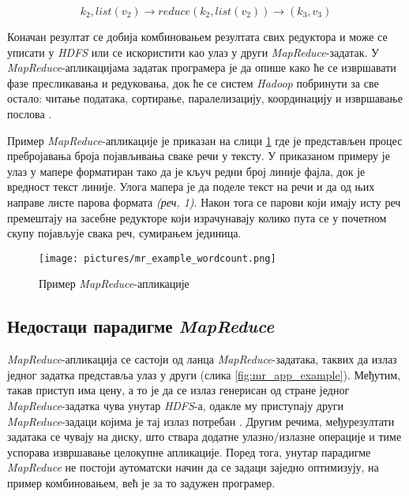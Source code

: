 \documentclass[12pt,oneside]{memoir}
\begin{document}
$$ k_2, list(v_2) \rightarrow reduce(k_2, list(v_2)) \rightarrow (k_3, v_3) $$

Коначан резултат се добија комбиновањем резултата свих редуктора и може се уписати у \textit{HDFS} или се искористити као улаз у други \textit{MapReduce}-задатак. У \textit{MapReduce}-апликацијама задатак програмера је да опише како ће се извршавати фазе пресликавања и редуковања, док ће се систем \textit{Hadoop} побринути за све остало: читање података, сортирање, паралелизацију, координацију и извршавање послова \cite{hadoop_beginner}.

Пример \textit{MapReduce}-апликације је приказан на слици \ref{fig:map_reduce} где је представљен процес пребројавања броја појављивања сваке речи у тексту. У приказаном примеру је улаз у мапере форматиран тако да је кључ редни број линије фајла, док је вредност текст линије. Улога мапера је да поделе текст на речи и да од њих направе листе парова формата \textit{(реч, 1)}. Након тога се парови који имају исту реч премештају на засебне редукторе који израчунавају колико пута се у почетном скупу појављује свака реч, сумирањем јединица.

\begin{figure}[!ht]
  \centering
  \texttt{[image: pictures/mr\_example\_wordcount.png]}
  \caption{Пример \textit{MapReduce}-апликације}
  \label{fig:map_reduce}
\end{figure}


\subsection{Недостаци парадигме \textit{MapReduce}}
\label{subsec:nedost_mr}

\textit{MapReduce}-апликација се састоји од ланца \textit{MapReduce}-задатака, таквих да излаз једног задатка представља улаз у други (слика \ref{fig:mr_app_example}). Међутим, такав приступ има цену, а то је да се излаз генерисан од стране једног \textit{MapReduce}-задатка чува унутар \textit{HDFS}-а, одакле му приступају други \textit{MapReduce}-задаци којима је тај излаз потребан \cite{hadoop_learning}. Другим речима, међурезултати задатака се чувају на диску, што ствара додатне улазно/излазне операције и тиме успорава извршавање целокупне апликације. Поред тога, унутар парадигме \textit{MapReduce} не постоји аутоматски начин да се задаци заједно оптимизују, на пример комбиновањем, већ је за то задужен програмер.
\end{document}
